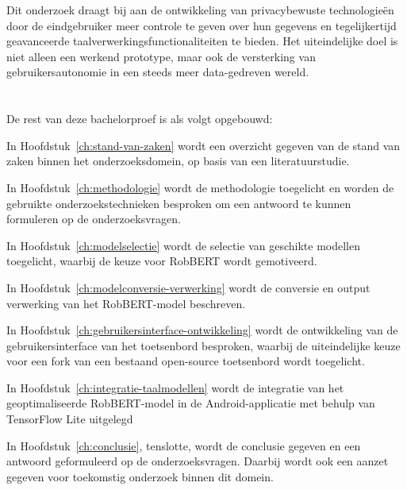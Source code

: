 Dit onderzoek draagt bij aan de ontwikkeling van privacybewuste technologieën door de eindgebruiker meer controle te geven over hun gegevens en tegelijkertijd geavanceerde taalverwerkingsfunctionaliteiten te bieden. Het uiteindelijke doel is niet alleen een werkend prototype, maar ook de versterking van gebruikersautonomie in een steeds meer data-gedreven wereld.

\section{}%
\label{sec:opzet-bachelorproef}


De rest van deze bachelorproef is als volgt opgebouwd:

In Hoofdstuk~\ref{ch:stand-van-zaken} wordt een overzicht gegeven van de stand van zaken binnen het onderzoeksdomein, op basis van een literatuurstudie.

In Hoofdstuk~\ref{ch:methodologie} wordt de methodologie toegelicht en worden de gebruikte onderzoekstechnieken besproken om een antwoord te kunnen formuleren op de onderzoeksvragen.

In Hoofdstuk~\ref{ch:modelselectie} wordt de selectie van geschikte modellen toegelicht, waarbij de keuze voor RobBERT wordt gemotiveerd.

In Hoofdstuk~\ref{ch:modelconversie-verwerking} wordt de conversie en output verwerking van het RobBERT-model beschreven.

In Hoofdstuk~\ref{ch:gebruikersinterface-ontwikkeling} wordt de ontwikkeling van de gebruikersinterface van het toetsenbord besproken, waarbij de uiteindelijke keuze voor een fork van een bestaand open-source toetsenbord wordt toegelicht.

In Hoofdstuk~\ref{ch:integratie-taalmodellen} wordt de integratie van het geoptimaliseerde RobBERT-model in de Android-applicatie met behulp van TensorFlow Lite uitgelegd

In Hoofdstuk~\ref{ch:conclusie}, tenslotte, wordt de conclusie gegeven en een antwoord geformuleerd op de onderzoeksvragen. Daarbij wordt ook een aanzet gegeven voor toekomstig onderzoek binnen dit domein.